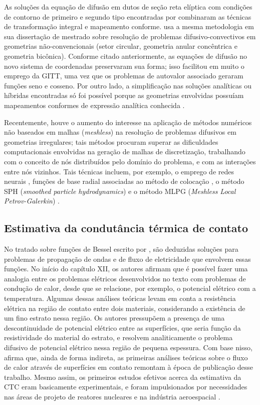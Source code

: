 As soluções da equação de difusão em dutos de seção reta elíptica com condições de contorno de primeiro e segundo tipo encontradas por
 \citet{trabalho_maia_1, trabalho_maia_2} combinaram as técnicas de transformação integral e mapeamento conforme. 
\cite{tese_antonini} usa a mesma metodologia em sua dissertação de mestrado sobre resolução de problemas difusivo-convectivos em geometrias não-convencionais (setor circular, geometria anular
concêntrica e geometria bicônica). Conforme citado anteriormente, as equações de difusão no novo sistema de coordenadas preservaram sua forma; isso facilitou em
muito o emprego da GITT, uma vez que os problemas de autovalor associado geraram funções seno e cosseno. Por outro lado, a
simplificação nas soluções analíticas ou híbridas encontradas só foi possível porque as geometrias envolvidas possuíam mapeamentos conformes de expressão analítica
conhecida \citep{livro_brown}.

Recentemente, houve o aumento do interesse na aplicação de métodos numéricos não baseados em malhas (\textit{meshless}) na resolução
de problemas difusivos em geometrias irregulares; tais métodos procuram superar as dificuldades computacionais envolvidas na geração
de malhas de discretização, trabalhando com o conceito de nós distribuídos pelo domínio do problema, e com as interações entre nós
vizinhos. Tais técnicas incluem, por exemplo, o emprego de redes neurais \citep{artigo_deng, artigo_heidari}, funções de base
radial associadas ao método de colocação \citep{artigo_chen, artigo_dai}, o método SPH (\textit{smoothed particle hydrodynamics}) \citep{artigo_vishwakarma} e o método MLPG (\textit{Meshless Local Petrov-Galerkin})
\citep{artigo_li}.

\subsection{Estimativa da condutância térmica de contato}

No tratado sobre funções de Bessel escrito por \cite{livro_bessel}, são deduzidas soluções para problemas de propagação de ondas e de fluxo de
eletricidade que envolvem essas funções. No início do capítulo XII, os autores afirmam que é possível fazer uma analogia entre os problemas
elétricos desenvolvidos no texto com problemas de condução de calor, desde que se relacione, por exemplo, o potencial elétrico com a temperatura. Algumas
dessas análises teóricas levam em conta a resistência elétrica na região de contato entre dois materiais, considerando a existência de um fino
estrato nessa região. Os autores pressupõem a presença de uma descontinuidade de potencial elétrico entre as superfícies,
que seria função da resistividade do material do estrato, e resolvem analiticamente o problema difusivo de potencial elétrico nessa região de pequena espessura. 
Com base nisso, \cite{tese_mikic} afirma que, ainda de forma indireta, as primeiras análises teóricas sobre o fluxo de calor através de superfícies
em contato remontam à época de publicação desse trabalho. Mesmo assim, os primeiros estudos efetivos acerca da estimativa da CTC eram basicamente experimentais,
e foram impulsionados por necessidades nas áreas de projeto de reatores nucleares e na indústria aeroespacial \citep{tese_mikic}.

